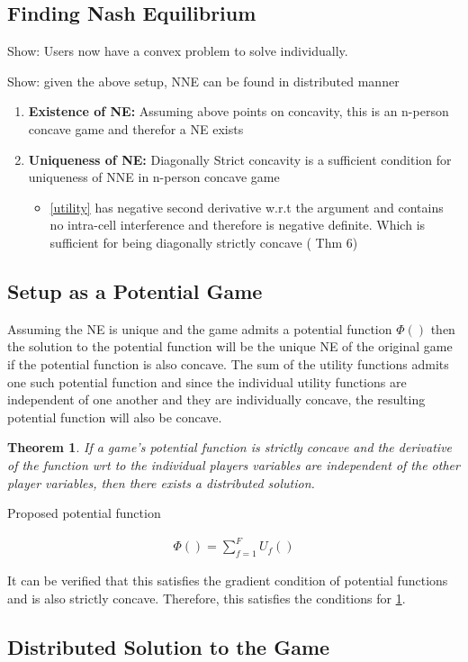 \documentclass[12pt]{article}
\newtheorem{theorem}{Theorem}
\begin{document}
\subsection{Finding Nash Equilibrium}

Show: Users now have a convex problem to solve individually.

Show: given the above setup, NNE can be found in distributed manner


\begin{enumerate}
\item \textbf{Existence of NE:} Assuming above points on concavity, this is an n-person concave game and therefor a NE exists
\item \textbf{Uniqueness of NE:} Diagonally Strict concavity is a sufficient condition for uniqueness of NNE in n-person concave game
\begin{itemize}
\item\eqref{utility} has negative second derivative w.r.t the argument and contains no intra-cell interference and therefore is negative definite. Which is sufficient for being diagonally strictly concave
\cite[Thm6]{rosen1964existence} ( Thm 6)

\end{itemize}

\end{enumerate}

\subsection{Setup as a Potential Game}
Assuming the NE is unique and the game admits a potential function $\Phi()$ then the solution to the potential function will be the unique NE of the original game if the potential function is also concave. 
The sum of the utility functions admits one such potential function and since the individual utility functions are independent of one another and they are individually concave, the resulting potential function will also be concave. 
\\
\begin{theorem}\label{distributed}
If a game's potential function is strictly concave and the derivative of the function wrt to the individual players variables are independent of the other player variables, then there exists a distributed solution.
\end{theorem}


Proposed potential function

\begin{gather*} 
\Phi() = \sum_{f = 1}^{F} U_f() 
\end{gather*}


It can be verified that this satisfies the gradient condition of potential functions and is also strictly concave. Therefore, this satisfies the conditions for \ref{distributed}.



\subsection{Distributed Solution to the Game}
\end{document}
